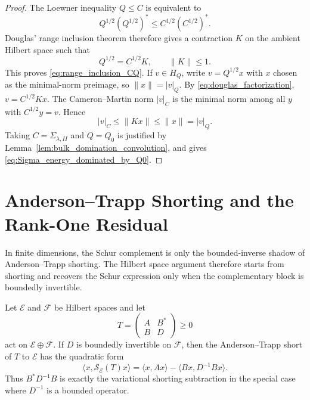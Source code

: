 \begin{proof}
The Loewner inequality $Q\le C$ is equivalent to
\[
  Q^{1/2}(Q^{1/2})^*\le C^{1/2}(C^{1/2})^*.
\]
Douglas' range inclusion theorem
therefore gives a contraction $K$ on the ambient Hilbert space such that
\begin{equation}
  Q^{1/2}=C^{1/2}K,
  \qquad \|K\|\le1.
  \label{eq:douglas_factorization}
\end{equation}
This proves \eqref{eq:range_inclusion_CQ}.  If $v\in H_Q$, write
$v=Q^{1/2}x$ with $x$ chosen as the minimal-norm preimage, so
$\|x\|=|v|_Q$.  By \eqref{eq:douglas_factorization},
$v=C^{1/2}Kx$.  The Cameron--Martin norm $|v|_C$ is the minimal norm among all
$y$ with $C^{1/2}y=v$.  Hence
\[
  |v|_C\le \|Kx\|\le\|x\|=|v|_Q.
\]
Taking $C=\Sigma_{\lambda,II}$ and $Q=Q_0$ is justified by
Lemma~\ref{lem:bulk_domination_convolution}, and gives
\eqref{eq:Sigma_energy_dominated_by_Q0}.
\end{proof}

\section{Anderson--Trapp Shorting and the Rank-One Residual}
\label{app:shorting_residual}

In finite dimensions, the Schur complement is only the bounded-inverse
shadow of Anderson--Trapp shorting.  The Hilbert space argument therefore
starts from shorting and recovers the Schur expression only when the
complementary block is boundedly invertible.

\begin{lemma}
\label{lem:schur_shadow_shorting}
Let $\mathcal{E}$ and $\mathcal{F}$ be Hilbert spaces and let
\[
  T=\begin{pmatrix}A&B^*\\B&D\end{pmatrix}\ge0
\]
act on $\mathcal{E}\oplus\mathcal{F}$.  If $D$ is boundedly invertible on
$\mathcal{F}$, then the Anderson--Trapp short of $T$ to $\mathcal{E}$ has the
quadratic form
\begin{equation}
  \langle x,\mathcal{S}_{\mathcal{E}}(T)x\rangle
  =
  \langle x,Ax\rangle-\langle Bx,D^{-1}Bx\rangle.
  \label{eq:short_shadow}
\end{equation}
Thus $B^*D^{-1}B$ is exactly the variational shorting subtraction in the special
case where $D^{-1}$ is a bounded operator.
\end{lemma}

